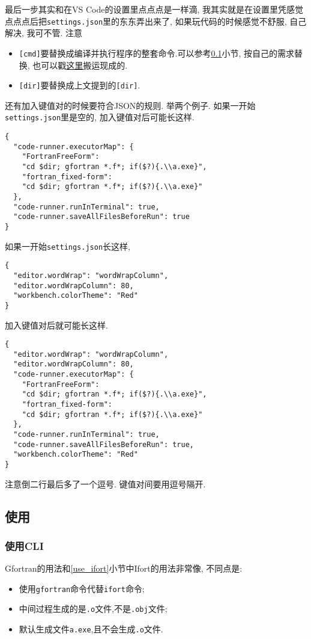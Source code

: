 最后一步其实和在VS Code的设置里点点点是一样滴, 我其实就是在设置里凭感觉点点点后把\texttt{settings.json}里的东东弄出来了, 如果玩代码的时候感觉不舒服, 自己解决, 我可不管. 注意
\begin{itemize}
    \item \texttt{[cmd]}要替换成编译并执行程序的整套命令.可以参考\ref{use_gfortran}小节, 按自己的需求替换, 也可以戳\href{https://zhuanlan.zhihu.com/p/362328064}{这里}搬运现成的.
    \item \texttt{[dir]}要替换成上文提到的\texttt{[dir]}.
\end{itemize}

还有加入键值对的时候要符合JSON的规则. 举两个例子.
如果一开始\texttt{settings.json}里是空的, 加入键值对后可能长这样.
\begin{lstlisting}
{
  "code-runner.executorMap": {
    "FortranFreeForm":
    "cd $dir; gfortran *.f*; if($?){.\\a.exe}",
    "fortran_fixed-form":
    "cd $dir; gfortran *.f*; if($?){.\\a.exe}"
  },
  "code-runner.runInTerminal": true,
  "code-runner.saveAllFilesBeforeRun": true
}
\end{lstlisting}
如果一开始\texttt{settings.json}长这样,
\begin{lstlisting}
{
  "editor.wordWrap": "wordWrapColumn",
  "editor.wordWrapColumn": 80,
  "workbench.colorTheme": "Red"
}
\end{lstlisting}
加入键值对后就可能长这样.
\begin{lstlisting}
{
  "editor.wordWrap": "wordWrapColumn",
  "editor.wordWrapColumn": 80,
  "code-runner.executorMap": {
    "FortranFreeForm":
    "cd $dir; gfortran *.f*; if($?){.\\a.exe}",
    "fortran_fixed-form":
    "cd $dir; gfortran *.f*; if($?){.\\a.exe}"
  },
  "code-runner.runInTerminal": true,
  "code-runner.saveAllFilesBeforeRun": true,
  "workbench.colorTheme": "Red"
}
\end{lstlisting}
注意倒二行最后多了一个逗号. 键值对间要用逗号隔开.

\subsection{使用}\label{use_gfortran}

\subsubsection{使用CLI}
Gfortran的用法和\ref{use_ifort}小节中Ifort的用法非常像, 不同点是:
\begin{itemize}
  \item 使用\texttt{gfortran}命令代替\texttt{ifort}命令;
  \item 中间过程生成的是\texttt{.o}文件,不是\texttt{.obj}文件;
  \item 默认生成文件\texttt{a.exe},且不会生成\texttt{.o}文件.
\end{itemize}

